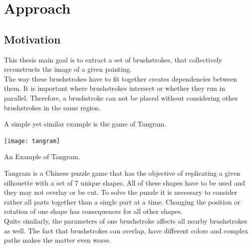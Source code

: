\setchapterpreamble[u]{\margintoc}
\chapter{Approach}


\section{Motivation}

%
%

This thesis main goal is to extract a set of brushstrokes, that collectively reconstructs the image of a given painting. \\
The way these brushstrokes have to fit together creates dependencies between them.
It is important where brushstrokes intersect or whether they run in parallel.
Therefore, a brushstroke can not be placed without considering other brushstrokes in the same region.

A simple yet similar example is the game of Tangram.
\begin{marginfigure}
    \texttt{[image: tangram]}
    \caption[]{An Example of Tangram.}
\end{marginfigure}
Tangram is a Chinese puzzle game that has the objective of replicating a given silhouette with a set of 7 unique shapes.
All of these shapes have to be used and they may not overlay or be cut.
To solve the puzzle it is necessary to consider rather all parts together than a single part at a time.
Changing the position or rotation of one shape has consequences for all other shapes.\\
Quite similarly, the parameters of one brushstroke affects all nearby brushstrokes as well.
The fact that brushstrokes can overlap, have different colors and complex paths makes the matter even worse.

